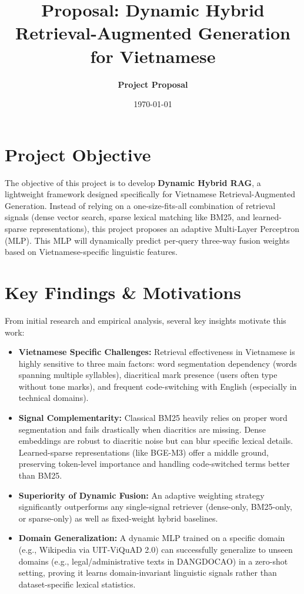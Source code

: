 \documentclass[11pt,a4paper]{article}
\title{\textbf{\color{primary}Proposal: Dynamic Hybrid Retrieval-Augmented Generation for Vietnamese}}
\author{\textbf{Project Proposal}}
\date{\today}
\begin{document}
\maketitle

\section{Project Objective}
The objective of this project is to develop \textbf{Dynamic Hybrid RAG}, a lightweight framework designed specifically for Vietnamese Retrieval-Augmented Generation. Instead of relying on a one-size-fits-all combination of retrieval signals (dense vector search, sparse lexical matching like BM25, and learned-sparse representations), this project proposes an adaptive Multi-Layer Perceptron (MLP). This MLP will dynamically predict per-query three-way fusion weights based on Vietnamese-specific linguistic features.

\section{Key Findings \& Motivations}
From initial research and empirical analysis, several key insights motivate this work:
\begin{itemize}[leftmargin=*]
    \item \textbf{Vietnamese Specific Challenges:} Retrieval effectiveness in Vietnamese is highly sensitive to three main factors: word segmentation dependency (words spanning multiple syllables), diacritical mark presence (users often type without tone marks), and frequent code-switching with English (especially in technical domains).
    \item \textbf{Signal Complementarity:} Classical BM25 heavily relies on proper word segmentation and fails drastically when diacritics are missing. Dense embeddings are robust to diacritic noise but can blur specific lexical details. Learned-sparse representations (like BGE-M3) offer a middle ground, preserving token-level importance and handling code-switched terms better than BM25.
    \item \textbf{Superiority of Dynamic Fusion:} An adaptive weighting strategy significantly outperforms any single-signal retriever (dense-only, BM25-only, or sparse-only) as well as fixed-weight hybrid baselines.
    \item \textbf{Domain Generalization:} A dynamic MLP trained on a specific domain (e.g., Wikipedia via UIT-ViQuAD 2.0) can successfully generalize to unseen domains (e.g., legal/administrative texts in DANGDOCAO) in a zero-shot setting, proving it learns domain-invariant linguistic signals rather than dataset-specific lexical statistics.
\end{itemize}
\end{document}
